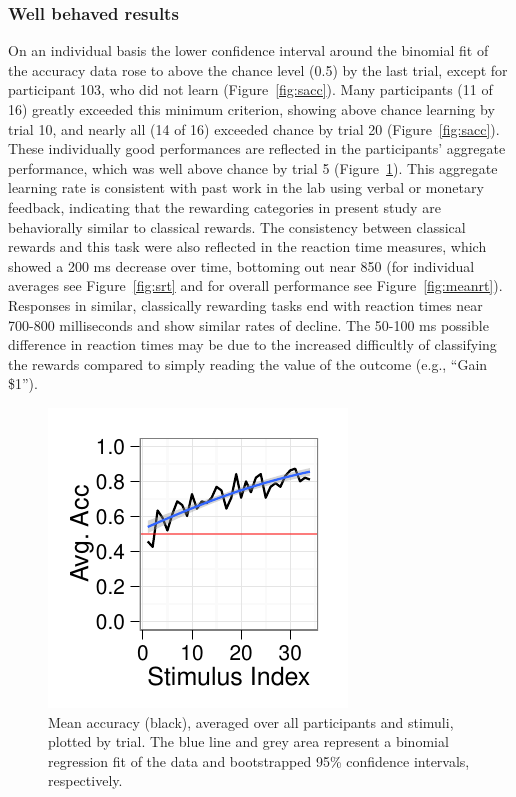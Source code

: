 \documentclass[doc,12pt]{apa}        %
\begin{document}
\subsubsection{Well behaved results}
\label{subsub:wellbehaved}
On an individual basis the lower confidence interval around the binomial fit of the accuracy data rose to above the chance level (0.5) by the last trial, except for participant 103, who did not learn (Figure~\ref{fig:sacc}).  Many participants (11 of 16) greatly exceeded this minimum criterion, showing above chance learning by trial 10, and nearly all (14 of 16) exceeded chance by trial 20  (Figure~\ref{fig:sacc}).  These individually good performances are reflected in the participants' aggregate performance, which was well above chance by trial 5 (Figure~\ref{fig:meanacc}).  This aggregate learning rate is consistent with past work in the lab using verbal or monetary feedback, indicating that the rewarding categories in present study are behaviorally similar to classical rewards.  The consistency between classical rewards and this task were also reflected in the reaction time measures, which showed a 200 ms decrease over time, bottoming out near 850 (for individual averages see Figure~\ref{fig:srt} and for overall performance see Figure~\ref{fig:meanrt}).  Responses in similar, classically rewarding tasks end with reaction times near 700-800 milliseconds and show similar rates of decline.  The 50-100 ms possible difference in reaction times may be due to the increased difficultly of classifying the rewards compared to simply reading the value of the outcome (e.g., ``Gain \$1'').

\begin{figure}[tp]
	\includegraphics{f_all_mean_acc}
    \centering
	\caption{Mean accuracy (black), averaged over all participants and stimuli, plotted by trial.  The blue line and grey area represent a binomial regression fit of the data and bootstrapped 95\% confidence intervals, respectively.}
	\label{fig:meanacc}
\end{figure}
\end{document}
